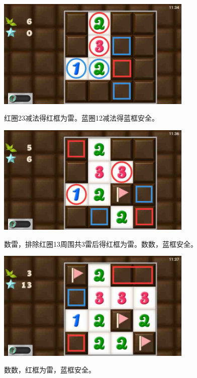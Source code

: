 \subsection{} %
\begin{center}
    \includegraphics[width=0.7\textwidth]{puzzlelow/166-1.jpg}
\end{center}
红圈23减法得红框为雷。蓝圈12减法得蓝框安全。
\begin{center}
    \includegraphics[width=0.7\textwidth]{puzzlelow/166-2.jpg}
\end{center}
数雷，排除红圈13周围共3雷后得红框为雷。数数，蓝框安全。
\begin{center}
    \includegraphics[width=0.7\textwidth]{puzzlelow/166-3.jpg}
\end{center}
数数，红框为雷，蓝框安全。

